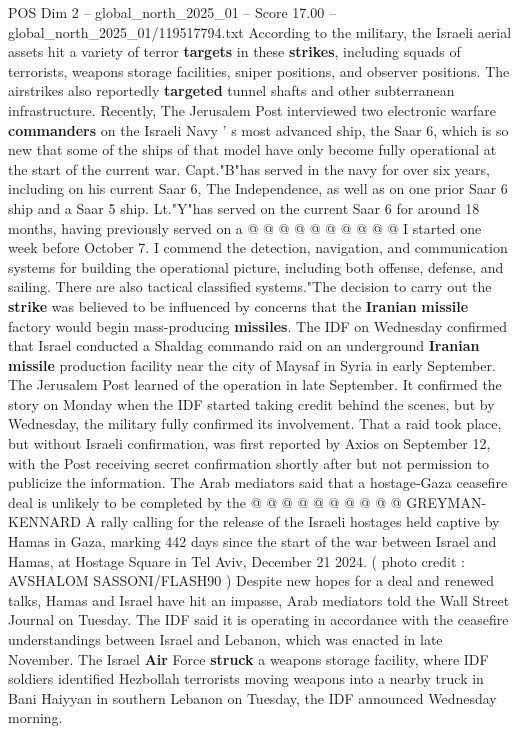 \begin{textsample}{POS Dim 2 – global\_north\_2025\_01 – Score 17.00 – global\_north\_2025\_01/119517794.txt}
According to the military, the Israeli aerial assets hit a variety of terror \textbf{targets} in these \textbf{strikes}, including squads of terrorists, weapons storage facilities, sniper positions, and observer positions.
The airstrikes also reportedly \textbf{targeted} tunnel shafts and other subterranean infrastructure.
Recently, The Jerusalem Post interviewed two electronic warfare \textbf{commanders} on the Israeli Navy ' s most advanced ship, the Saar 6, which is so new that some of the ships of that model have only become fully operational at the start of the current war.
Capt."B"has served in the navy for over six years, including on his current Saar 6, The Independence, as well as on one prior Saar 6 ship and a Saar 5 ship.
Lt."Y"has served on the current Saar 6 for around 18 months, having previously served on a @ @ @ @ @ @ @ @ @ @ I started one week before October 7.
I commend the detection, navigation, and communication systems for building the operational picture, including both offense, defense, and sailing.
There are also tactical classified systems."The decision to carry out the \textbf{strike} was believed to be influenced by concerns that the \textbf{Iranian} \textbf{missile} factory would begin mass-producing \textbf{missiles}.
The IDF on Wednesday confirmed that Israel conducted a Shaldag commando raid on an underground \textbf{Iranian} \textbf{missile} production facility near the city of Maysaf in Syria in early September.
The Jerusalem Post learned of the operation in late September.
It confirmed the story on Monday when the IDF started taking credit behind the scenes, but by Wednesday, the military fully confirmed its involvement.
That a raid took place, but without Israeli confirmation, was first reported by Axios on September 12, with the Post receiving secret confirmation shortly after but not permission to publicize the information.
The Arab mediators said that a hostage-Gaza ceasefire deal is unlikely to be completed by the @ @ @ @ @ @ @ @ @ @ GREYMAN-KENNARD A rally calling for the release of the Israeli hostages held captive by Hamas in Gaza, marking 442 days since the start of the war between Israel and Hamas, at Hostage Square in Tel Aviv, December 21 2024. ( photo credit : AVSHALOM SASSONI/FLASH90 ) Despite new hopes for a deal and renewed talks, Hamas and Israel have hit an impasse, Arab mediators told the Wall Street Journal on Tuesday.
The IDF said it is operating in accordance with the ceasefire understandings between Israel and Lebanon, which was enacted in late November.
The Israel \textbf{Air} Force \textbf{struck} a weapons storage facility, where IDF soldiers identified Hezbollah terrorists moving weapons into a nearby truck in Bani Haiyyan in southern Lebanon on Tuesday, the IDF announced Wednesday morning.

\end{textsample}
